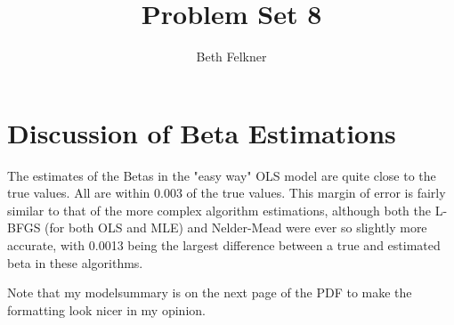 \documentclass{article}
\begin{document}
\title{Problem Set 8}
\author{Beth Felkner}
\maketitle
\section{Discussion of Beta Estimations}
The estimates of the Betas in the "easy way" OLS model are quite close to the true values. All are within 0.003 of the true values. This margin of error is fairly similar to that of the more complex algorithm estimations, although both the L-BFGS (for both OLS and MLE) and Nelder-Mead were ever so slightly more accurate, with 0.0013 being the largest difference between a true and estimated beta in these algorithms.

Note that my modelsummary is on the next page of the PDF to make the formatting look nicer in my opinion.

\pagebreak
\end{document}
